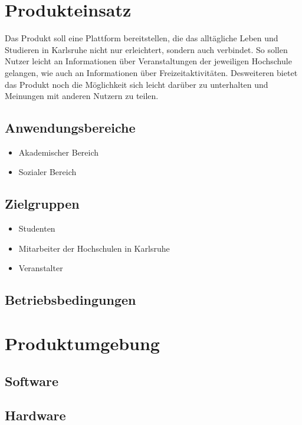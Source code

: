 \documentclass[parskip=full]{scrartcl}
\begin{document}
	
	\section{Produkteinsatz}
	Das Produkt soll eine Plattform bereitstellen, die das alltägliche Leben und Studieren in Karlsruhe nicht nur erleichtert, sondern auch verbindet. So sollen Nutzer leicht an Informationen über Veranstaltungen der jeweiligen Hochschule gelangen, wie auch an Informationen über Freizeitaktivitäten. Desweiteren bietet das Produkt noch die Möglichkeit sich leicht darüber zu unterhalten und Meinungen mit anderen Nutzern zu teilen.
	
	\subsection{Anwendungsbereiche}
		\begin{itemize}
			\item Akademischer Bereich
			\item Sozialer Bereich
		\end{itemize}
		
	\subsection{Zielgruppen}
		\begin{itemize}
			\item Studenten
			\item Mitarbeiter der Hochschulen in Karlsruhe
			\item Veranstalter
		\end{itemize}
		
	\subsection{Betriebsbedingungen}
	
	
	\section{Produktumgebung}
	
	\subsection{Software}
	
	\subsection{Hardware}
	
\end{document}
